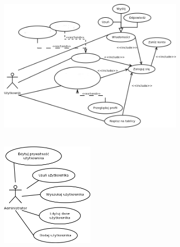 \begin{figure}[h!]
	\centering
	\HRule\\[1.5em]
		\includegraphics[width=0.8\textwidth]{img/usecase1.png}
	\\[0.3em]\HRule
	\label{rys:usecase1}
\end{figure}
\begin{figure}[h!]
	\centering
	\HRule\\[1.5em]
		\includegraphics[width=0.4\textwidth]{img/usecase3.png}
        \\[0.3em]\HRule
	\label{rys:usecase3}
\end{figure}

